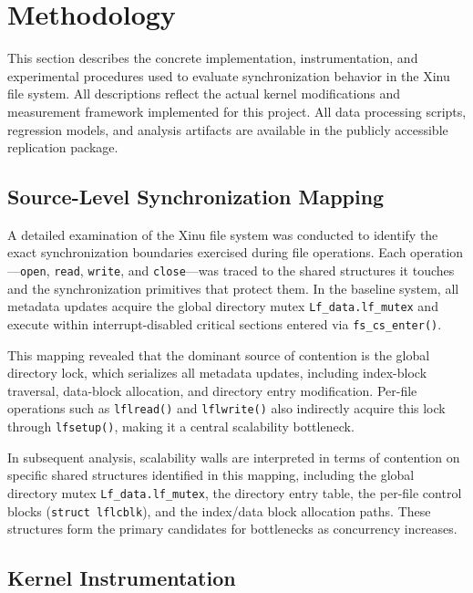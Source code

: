 \documentclass[sigconf]{acmart}
\begin{document}
\section{Methodology}
\label{sec:methods}

This section describes the concrete implementation, instrumentation, and experimental procedures used to evaluate synchronization behavior in the Xinu file system. All descriptions reflect the actual kernel modifications and measurement framework implemented for this project. All data processing scripts, regression models, and analysis artifacts
are available in the publicly accessible replication package\cite{omoregie2026xinu}. 

\subsection{Source-Level Synchronization Mapping}

A detailed examination of the Xinu file system was conducted to identify the exact synchronization boundaries exercised during file operations. Each operation---\texttt{open}, \texttt{read}, \texttt{write}, and \texttt{close}---was traced to the shared structures it touches and the synchronization primitives that protect them. In the baseline system, all metadata updates acquire the global directory mutex \texttt{Lf\_data.lf\_mutex} and execute within interrupt-disabled critical sections entered via \texttt{fs\_cs\_enter()}.

This mapping revealed that the dominant source of contention is the global directory lock, which serializes all metadata updates, including index-block traversal, data-block allocation, and directory entry modification. Per-file operations such as \texttt{lflread()} and \texttt{lflwrite()} also indirectly acquire this lock through \texttt{lfsetup()}, making it a central scalability bottleneck.

In subsequent analysis, scalability walls are interpreted in terms of contention on specific shared structures identified in this mapping, including the global directory mutex \texttt{Lf\_data.lf\_mutex}, the directory entry table, the per-file control blocks (\texttt{struct lflcblk}), and the index/data block allocation paths. These structures form the primary candidates for bottlenecks as concurrency increases.



\subsection{Kernel Instrumentation}
\end{document}
